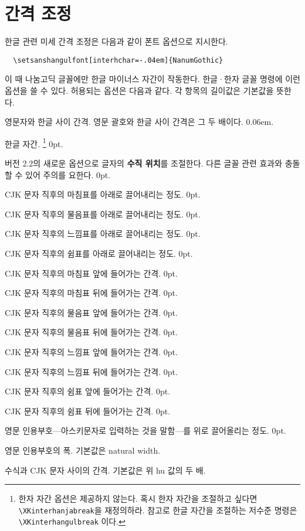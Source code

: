 \documentclass[a4paper]{article}
\def\cs#1{\texttt{\textbackslash #1}}
\def\hemph#1{\textsf{\bfseries #1}}
\def\hparens#1{\leavevmode\unskip---{\small #1}---\ignorespaces}
\begin{document}
\section{간격 조정}
한글 관련 미세 간격 조정은 다음과 같이 폰트 옵션으로 지시한다.
\begin{verbatim}
  \setsanshangulfont[interhchar=-.04em]{NanumGothic}
\end{verbatim}
이 때 나눔고딕 글꼴에만 한글 마이너스 자간이 작동한다.
 한글·한자 글꼴
명령에 이런 옵션을 쓸 수 있다.
허용되는 옵션은 다음과 같다. 각 항목의 길이값은 기본값을 뜻한다.
\begin{description}\itemsep0pt
\item[hu]
  영문자와 한글 사이 간격. 영문 괄호와 한글 사이 간격은 그 두 배이다. 0.06em.
\item[interhchar]
  { 한글 자간.}%
  \footnote{한자 자간 옵션은 제공하지 않는다.
  혹시 한자 자간을 조절하고 싶다면 \cs{XKinterhanjabreak}을 재정의하라.
  참고로 한글 자간을 조절하는 저수준 명령은 \cs{XKinterhangulbreak} 이다.}
  0pt.
\item[charraise] 버전 2.2의 새로운 옵션으로
  글자의 \hemph{수직 위치}를 조절한다.
  다른 글꼴 관련 효과와 충돌할 수 있어 주의를 요한다. 0pt.
\item[lowerperiod]
  CJK 문자 직후의 마침표를 아래로 끌어내리는
  {정도. 0pt.}
\item[lowerquestion]
  CJK 문자 직후의 물음표를 아래로 끌어내리는 정도. 0pt.
\item[lowerexclamation]
  CJK 문자 직후의 느낌표를 아래로 끌어내리는 정도. 0pt.
\item[lowercomma]
  CJK 문자 직후의 쉼표를 아래로 끌어내리는 정도. 0pt.
\item[preperiodkern]
  {CJK 문자 직후의 마침표 앞에
  들어가는 간격. 0pt.}
\item[postperiodkern]
  {CJK 문자 직후의 마침표 뒤에
  들어가는 간격. 0pt.}
\item[prequestionkern]
  CJK 문자 직후의 물음표 앞에 들어가는 간격. 0pt.
\item[postquestionkern]
  CJK 문자 직후의 물음표 뒤에 들어가는 간격. 0pt.
\item[preexclamationkern]
  CJK 문자 직후의 느낌표 앞에 들어가는 간격. 0pt.
\item[postexclamationkern]
  CJK 문자 직후의 느낌표 뒤에 들어가는 간격. 0pt.
\item[precommakern]
  CJK 문자 직후의 쉼표 앞에 들어가는 간격. 0pt.
\item[postcommakern]
  CJK 문자 직후의 쉼표 뒤에 들어가는 간격. 0pt.
\item[quoteraise]
  영문 인용부호\hparens{아스키문자로 입력하는 것을 말함}를
  위로 끌어올리는 정도. 0pt.
\item[quotewidth]
  영문 인용부호의 폭. 기본값은 natural width.
\item[postmathskip]
  수식과 CJK 문자 사이의 간격.  기본값은 위 hu 값의 두 배.
\end{description}
\end{document}
